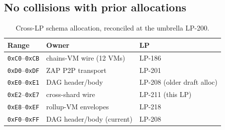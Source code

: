 \subsection{No collisions with prior allocations}

\begin{table}[h]
\centering
\small
\begin{tabular}{@{}lll@{}}
\toprule
\textbf{Range} & \textbf{Owner} & \textbf{LP} \\
\midrule
\texttt{0xC0}--\texttt{0xCB} & chains-VM wire (12 VMs) & LP-186 \\
\texttt{0xD0}--\texttt{0xDF} & ZAP P2P transport & LP-201 \\
\texttt{0xE0}--\texttt{0xE1} & DAG header/body & LP-208 (older draft alloc) \\
\texttt{0xE2}--\texttt{0xE7} & cross-shard wire & LP-211 (this LP) \\
\texttt{0xE8}--\texttt{0xEF} & rollup-VM envelopes & LP-218 \\
\texttt{0xF0}--\texttt{0xFF} & DAG header/body (current) & LP-208 \\
\bottomrule
\end{tabular}
\caption{Cross-LP schema allocation, reconciled at the umbrella
LP-200.}
\label{tab:alloc}
\end{table}
